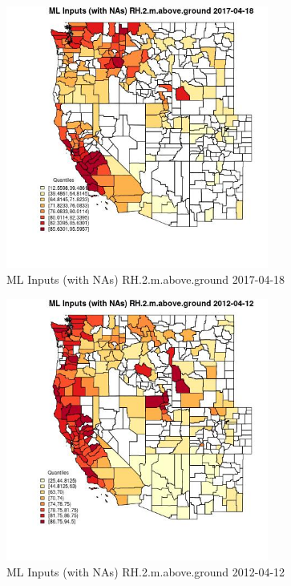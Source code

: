 \begin{figure} 
\centering  
\includegraphics[width=0.77\textwidth]{Code_Outputs/Report_ML_input_PM25_Step4_part_e_de_duplicated_aves_compiled_2019-05-14wNAs_CountyRH2mabovegroundMean2017-04-18_2017-04-18.jpg} 
\caption{\label{fig:Report_ML_input_PM25_Step4_part_e_de_duplicated_aves_compiled_2019-05-14wNAsCountyRH2mabovegroundMean2017-04-18_2017-04-18}ML Inputs (with NAs) RH.2.m.above.ground 2017-04-18} 
\end{figure} 
 

\begin{figure} 
\centering  
\includegraphics[width=0.77\textwidth]{Code_Outputs/Report_ML_input_PM25_Step4_part_e_de_duplicated_aves_compiled_2019-05-14wNAs_CountyRH2mabovegroundMean2012-04-12_2012-04-12.jpg} 
\caption{\label{fig:Report_ML_input_PM25_Step4_part_e_de_duplicated_aves_compiled_2019-05-14wNAsCountyRH2mabovegroundMean2012-04-12_2012-04-12}ML Inputs (with NAs) RH.2.m.above.ground 2012-04-12} 
\end{figure} 
 

